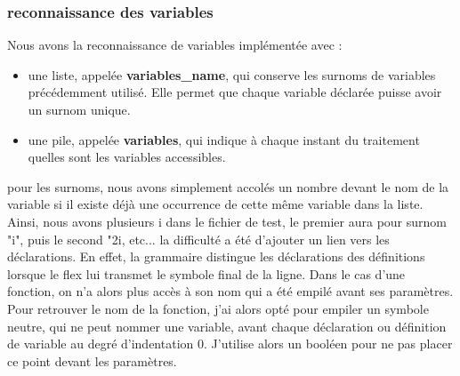 \subsubsection*{reconnaissance des variables}
Nous avons la reconnaissance de variables implémentée avec :
\begin{itemize}
	\item une liste, appelée \textbf{variables\_name}, qui conserve les surnoms de variables précédemment utilisé. Elle permet que chaque variable déclarée puisse avoir un surnom unique.
	\item une pile, appelée \textbf{variables}, qui indique à chaque instant du traitement quelles sont les variables accessibles.
\end{itemize}
pour les surnoms, nous avons simplement accolés un nombre devant le nom de la variable si il existe déjà une occurrence  de cette même variable dans la liste. Ainsi, nous avons plusieurs i dans le fichier de test, le premier aura pour surnom "i", puis le second "2i, etc... \newline
la difficulté a été d'ajouter un lien vers les déclarations. En effet, la grammaire distingue les déclarations des définitions lorsque le flex lui transmet le symbole final de la ligne. \newline 
Dans le cas d'une fonction, on n'a alors plus accès à son nom qui a été empilé avant ses paramètres.
\newline 
Pour retrouver le nom de la fonction, j'ai alors opté pour empiler un symbole neutre, qui ne peut nommer une variable, avant chaque déclaration ou définition de variable au degré d'indentation 0. J'utilise alors un booléen pour ne pas placer ce point devant les paramètres. \newline

